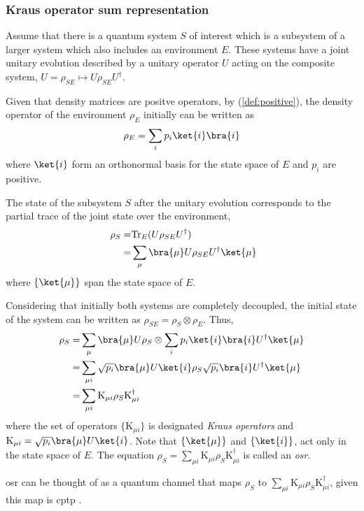 \subsubsection{Kraus operator sum representation}
Assume that there is a quantum system $S$ of interest which is a subsystem of a larger system which also includes an environment $E$. These systems have a joint unitary evolution described by a unitary operator $U$ acting on the composite system, $U = \rho_{SE} \mapsto U \rho_{SE} U^{\dag}$. 

Given that density matrices are positve operators, by (\autoref{def:positive}), the density operator of the environment $\rho_E$ initially can be written as 
\begin{equation*}
  \rho_E = \sum_{i} p_{i} \ket{i} \bra{i}
\end{equation*}
where $\ket{i}$ form an orthonormal basis for the state space of $E$ and $p_{i}$ are positive. 

The state of the subsystem $S$ after the unitary evolution corresponds to the partial trace of the joint state over the environment,
\begin{align*}
  \rho_{S} = & \text{Tr}_{E}(U \rho_{SE} U^{\dag}) \\
 = & \sum_{\mu} \bra{\mu} U \rho_{SE} U^{\dag} \ket{\mu}
\end{align*}
where $\{\ket{\mu}\}$ span the state space of $E$.

 
Considering that initially both systems are completely decoupled, the initial state of the system can be written as $ \rho_{SE} = \rho_{S} \otimes \rho_{E}$. Thus,
\begin{align*} 
  \rho_{S} = & \sum_{\mu} \bra{\mu} U \rho_{S} \otimes \sum_{i} p_{i} \ket{i} \bra{i} U^{\dag} \ket{\mu} \\
  = & \sum_{\mu i}  \sqrt{p_{i}} \bra{\mu} U \ket{i} \rho_{S} \sqrt{p_{i}} \bra{i} U^{\dag} \ket{\mu}  \\ 
  = & \sum_{\mu i} \text{K}_{\mu i} \rho_{S} \text{K}_{\mu i}^{\dag}
\end{align*}
where the set of operators $\{\text{K}_{\mu i}\}$ is designated \emph{Kraus operators} and $\text{K}_{\mu i} = \sqrt{p_{i}} \bra{\mu} U \ket{i}$. Note that $\{\ket{\mu}\}$ and $\{\ket{i}\}$, act only in the state space of $E$. The equation $ \rho_{S} = \sum_{\mu i} \text{K}_{\mu i} \rho_{S} \text{K}_{\mu i}^{\dag} $ is called an \emph{\acrfull{osr}}.

\acrshort{osr} can be thought of as a quantum channel that maps $\rho_{S}$ to $\sum_{\mu i} \text{K}_{\mu i} \rho_{S} \text{K}_{\mu i}^{\dag}$, given this map is \acrshort{cptp} \cite{lidar2019lecture}. 

